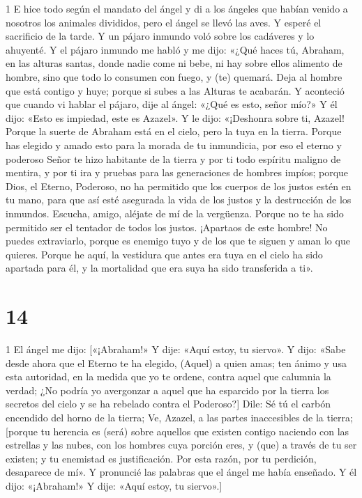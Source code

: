 \par 1 E hice todo según el mandato del ángel y di a los ángeles que habían venido a nosotros los animales divididos, pero el ángel se llevó las aves. Y esperé el sacrificio de la tarde. Y un pájaro inmundo voló sobre los cadáveres y lo ahuyenté. Y el pájaro inmundo me habló y me dijo: «¿Qué haces tú, Abraham, en las alturas santas, donde nadie come ni bebe, ni hay sobre ellos alimento de hombre, sino que todo lo consumen con fuego, y (te) quemará. Deja al hombre que está contigo y huye; porque si subes a las Alturas te acabarán. Y aconteció que cuando vi hablar el pájaro, dije al ángel: «¿Qué es esto, señor mío?» Y él dijo: «Esto es impiedad, este es Azazel». Y le dijo: «¡Deshonra sobre ti, Azazel! Porque la suerte de Abraham está en el cielo, pero la tuya en la tierra. Porque has elegido y amado esto para la morada de tu inmundicia, por eso el eterno y poderoso Señor te hizo habitante de la tierra y por ti todo espíritu maligno de mentira, y por ti ira y pruebas para las generaciones de hombres impíos; porque Dios, el Eterno, Poderoso, no ha permitido que los cuerpos de los justos estén en tu mano, para que así esté asegurada la vida de los justos y la destrucción de los inmundos. Escucha, amigo, aléjate de mí de la vergüenza. Porque no te ha sido permitido ser el tentador de todos los justos. ¡Apartaos de este hombre! No puedes extraviarlo, porque es enemigo tuyo y de los que te siguen y aman lo que quieres. Porque he aquí, la vestidura que antes era tuya en el cielo ha sido apartada para él, y la mortalidad que era suya ha sido transferida a ti».

\chapter{14}

\par 1 El ángel me dijo: [«¡Abraham!» Y dije: «Aquí estoy, tu siervo». Y dijo: «Sabe desde ahora que el Eterno te ha elegido, (Aquel) a quien amas; ten ánimo y usa esta autoridad, en la medida que yo te ordene, contra aquel que calumnia la verdad; ¿No podría yo avergonzar a aquel que ha esparcido por la tierra los secretos del cielo y se ha rebelado contra el Poderoso?] Dile: Sé tú el carbón encendido del horno de la tierra; Ve, Azazel, a las partes inaccesibles de la tierra; [porque tu herencia es (será) sobre aquellos que existen contigo naciendo con las estrellas y las nubes, con los hombres cuya porción eres, y (que) a través de tu ser existen; y tu enemistad es justificación. Por esta razón, por tu perdición, desaparece de mí». Y pronuncié las palabras que el ángel me había enseñado. Y él dijo: «¡Abraham!» Y dije: «Aquí estoy, tu siervo».]

